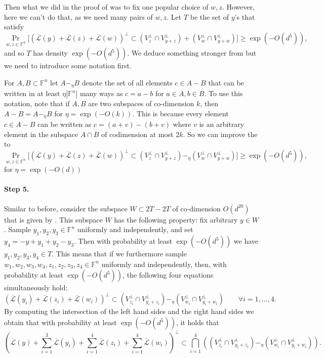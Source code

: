 \documentclass[12pt]{article}
\newcommand{\F}{\mathbb{F}}
\newcommand{\LL}{\mathcal{L}}
\begin{document}
Then what we did in the proof of  was to fix one popular choice of $w,z$. However, here we can't do that, as we need many pairs of $w,z$.
Let $T$ be the set of $y$'s that satisfy
\begin{equation}\label{equation:step4prob}
\Pr_{w,z\in \F^n} \bigg[ \left( \overline{\LL}(y) + \overline{\LL}(z) + \overline{\LL}(w)  \right)^\perp \subset \left( V^\perp_{z}\cap V^\perp_{y+z} \right) + \left( V^\perp_{w} \cap V^\perp_{y+w} \right)    \bigg] \ge \exp(-O(d^5)),
\end{equation}
and so $T$ has density $\exp(-O(d^5))$.
We deduce something stronger from  but we need to introduce some notation first.

For $A,B\subset\F^n$ let $A-_\eta B$ denote the set of all elements $c\in A-B$ that can be written in at least $\eta|\F^n|$ many ways as $c = a-b$ for $a\in A,b\in B$.
To use this notation, note that if $A,B$ are two subspaces of co-dimension $k$, then $A - B = A -_\eta B$ for $\eta =\exp(-O(k))$. This is because every element $c\in A-B$ can be written as $c = (a+v)-(b+v)$ where $v$ is an arbitrary element in the subspace $A\cap B$ of codimension at most $2k$. So we can improve the  to
\begin{equation}\label{equation:step4probconv}
\Pr_{w,z\in \F^n} \bigg[ \left( \overline{\LL}(y) + \overline{\LL}(z) + \overline{\LL}(w)  \right)^\perp \subset \left( V^\perp_{z}\cap V^\perp_{y+z} \right) -_\eta \left( V^\perp_{w} \cap V^\perp_{y+w} \right)    \bigg] \ge \exp(-O(d^5)),
\end{equation}
for $\eta = \exp{(-O(d))} $
\paragraph{Step 5.}
Similar to before, consider the subspace $W\subset 2T-2T$ of co-dimension $O(d^{20})$ that is given by . This subspace $W$ has the following property: fix arbitrary $y\in W$. Sample $y_1,y_2,y_3\in \F^n$ uniformly and independently, and set $y_4 = -y + y_1 + y_2 - y_3$. Then with probability at least $\exp(-O(d^5))$ we have $y_1,y_2,y_3,y_4 \in T$. This means that if we furthermore sample  $w_1,w_2,w_3,w_4,z_1,z_2,z_3,z_4\in \F^n$ uniformly and independently, then, with probability at least $\exp(-O(d^5))$, the following four equations simultaneously hold:
$$	\left( \overline{\LL}(y_i) + \overline{\LL}(z_i) + \overline{\LL}(w_i)  \right)^\perp \subset \left( V^\perp_{z_i}\cap V^\perp_{y_i+z_i} \right) -_\eta  \left( V^\perp_{w_i} \cap V^\perp_{y_i+w_i} \right) \qquad \forall i=1,\ldots,4.
$$
By computing the intersection of the left hand sides and the right hand sides we obtain
that with probability at least $\exp(-O(d^5))$, it holds that
\begin{equation}\label{equation:allintersections}
\left( \overline{\LL}(y) + \sum_{i=1}^3 \overline{\LL}(y_i)+ \sum_{i=1}^4 \overline{\LL}(z_i)+ \sum_{i=1}^4 \overline{\LL}(w_i)\right)^\perp  \subset  \bigcap_{i=1}^4 \left( \left( V^\perp_{z_i}\cap V^\perp_{y_i+z_i} \right) -_\eta  \left( V^\perp_{w_i} \cap V^\perp_{y_i+w_i} \right)  \right).
\end{equation}
\end{document}
